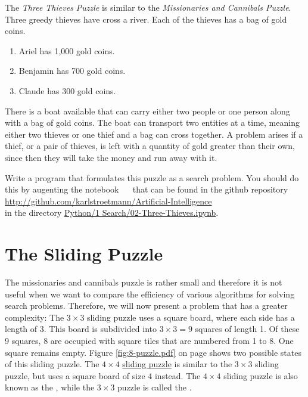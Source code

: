 \exercise
The \emph{Three Thieves Puzzle} is similar to the \emph{Missionaries and Cannibals Puzzle}.  Three greedy
thieves have cross a river.  Each of the thieves has a bag of gold coins.
\begin{enumerate}
\item Ariel has 1,000 gold coins.
\item Benjamin has 700 gold coins.
\item Claude has 300 gold coins.
\end{enumerate}
There is a boat available that can carry either two people or one person along with a bag of gold coins. The
boat can transport two entities at a time, meaning either two thieves or one thief and a bag can cross
together. A problem arises if a thief, or a pair of thieves, is left with a quantity of gold greater than
their own, since then they will take the money and run away with it. 

Write a program that formulates this puzzle as a search problem.  You should do this by augenting the notebook
\  \ that can be found in the github repository 
\\[0.2cm]
\hspace*{1.3cm}
\href{https://github.com/karlstroetmann/Artificial-Intelligence}{http://github.com/karlstroetmann/Artificial-Intelligence}
\\[0.2cm]
in the directory
\href{https://github.com/karlstroetmann/Artificial-Intelligence/blob/master/Python/1%20Search/02-Three-Thieves.ipynb}{Python/1 Search/02-Three-Thieves.ipynb}. 
\eox


\section{The Sliding Puzzle}
The missionaries and cannibals puzzle is rather small and therefore it is not useful when we want to compare
the efficiency of various algorithms for solving search problems.  Therefore, we will now present a problem
that has a greater complexity:  The $3 \times 3$ sliding puzzle uses a 
square board, where each side has a length of 3.  This board is subdivided into $3 \times 3 = 9$ squares of length 1.  Of
these 9 squares, 8 are occupied with square tiles that are numbered from 1 to 8.  One square remains
empty. Figure \ref{fig:8-puzzle.pdf} on page \pageref{fig:8-puzzle.pdf} shows two possible states of this
sliding puzzle.  The $4 \times 4$ \href{https://en.wikipedia.org/wiki/15_puzzle}{sliding puzzle}
is similar to the $3 \times 3$ sliding puzzle, but uses a square board of size 4
instead.  The $4 \times 4$ sliding puzzle is also known as the , while the $3 \times 3$ puzzle is
called the .  

